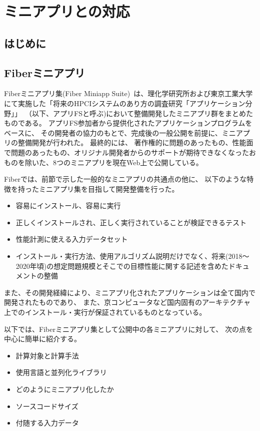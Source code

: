 \section{ミニアプリとの対応}
\label{sec:ミニアプリ}

\subsection{はじめに}

\subsection{Fiberミニアプリ}
Fiberミニアプリ集(Fiber Miniapp Suite)~\cite{Fiber}は、理化学研究所および東京工業大学にて実施した「将来のHPCIシステムのあり方の調査研究「アプリケーション分野」」~\cite{ApliFS}（以下、アプリFSと呼ぶ)において整備開発したミニアプリ群をまとめたものである。
アプリFS参加者から提供化されたアプリケーションプログラムをベースに、
その開発者の協力のもとで、完成後の一般公開を前提に、ミニアプリの整備開発が行われた。
最終的には、
著作権的に問題のあったもの、性能面で問題のあったもの、オリジナル開発者からのサポートが期待できなくなったおものを除いた、8つのミニアプリを現在Web上で公開している。

Fiberでは、前節で示した一般的なミニアプリの共通点の他に、
以下のような特徴を持ったミニアプリ集を目指して開発整備を行った。

\begin{itemize}
\item 容易にインストール、容易に実行
\item 正しくインストールされ、正しく実行されていることが検証できるテスト
\item 性能計測に使える入力データセット
\item インストール・実行方法、使用アルゴリズム説明だけでなく、将来(2018〜2020年頃)の想定問題規模とそこでの目標性能に関する記述を含めたドキュメントの整備
 \end{itemize}

また、その開発経緯により、ミニアプリ化されたアプリケーションは全て国内で開発されたものであり、
また、京コンピュータなど国内固有のアーキテクチャ上でのインストール・実行が保証されているものとなっている。

以下では、Fiberミニアプリ集として公開中の各ミニアプリに対して、
次の点を中心に簡単に紹介する。
\begin{itemize}
\item 計算対象と計算手法
\item 使用言語と並列化ライブラリ
\item どのようにミニアプリ化したか
\item ソースコードサイズ       
\item 付随する入力データ
\end{itemize}

